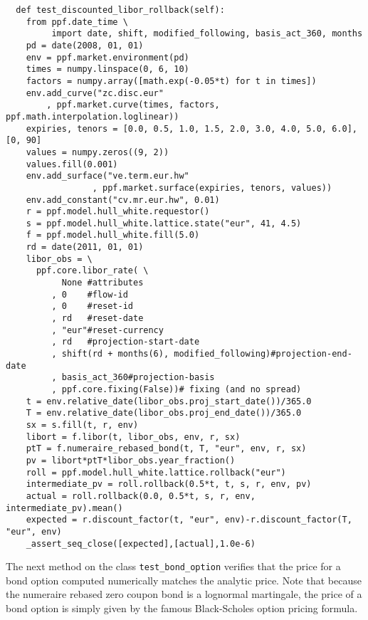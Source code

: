 \begin{verbatim}
  def test_discounted_libor_rollback(self):
    from ppf.date_time \
         import date, shift, modified_following, basis_act_360, months
    pd = date(2008, 01, 01)
    env = ppf.market.environment(pd)
    times = numpy.linspace(0, 6, 10)
    factors = numpy.array([math.exp(-0.05*t) for t in times])
    env.add_curve("zc.disc.eur"
        , ppf.market.curve(times, factors, ppf.math.interpolation.loglinear))
    expiries, tenors = [0.0, 0.5, 1.0, 1.5, 2.0, 3.0, 4.0, 5.0, 6.0], [0, 90]
    values = numpy.zeros((9, 2))
    values.fill(0.001)
    env.add_surface("ve.term.eur.hw"
                 , ppf.market.surface(expiries, tenors, values))
    env.add_constant("cv.mr.eur.hw", 0.01)
    r = ppf.model.hull_white.requestor()
    s = ppf.model.hull_white.lattice.state("eur", 41, 4.5)
    f = ppf.model.hull_white.fill(5.0)
    rd = date(2011, 01, 01)
    libor_obs = \
      ppf.core.libor_rate( \
           None #attributes
         , 0    #flow-id
         , 0    #reset-id
         , rd   #reset-date
         , "eur"#reset-currency
         , rd   #projection-start-date
         , shift(rd + months(6), modified_following)#projection-end-date
         , basis_act_360#projection-basis
         , ppf.core.fixing(False))# fixing (and no spread)
    t = env.relative_date(libor_obs.proj_start_date())/365.0
    T = env.relative_date(libor_obs.proj_end_date())/365.0
    sx = s.fill(t, r, env)
    libort = f.libor(t, libor_obs, env, r, sx)
    ptT = f.numeraire_rebased_bond(t, T, "eur", env, r, sx)
    pv = libort*ptT*libor_obs.year_fraction()
    roll = ppf.model.hull_white.lattice.rollback("eur")
    intermediate_pv = roll.rollback(0.5*t, t, s, r, env, pv)
    actual = roll.rollback(0.0, 0.5*t, s, r, env, intermediate_pv).mean() 
    expected = r.discount_factor(t, "eur", env)-r.discount_factor(T, "eur", env)
    _assert_seq_close([expected],[actual],1.0e-6)
\end{verbatim}
The next method on the class \verb|test_bond_option| verifies that the price for a bond option computed numerically matches the analytic price. Note that because the 
numeraire rebased zero coupon bond is a lognormal martingale, the price of a bond option is simply given by the famous Black-Scholes option pricing formula.


